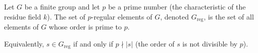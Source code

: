 Let $G$ be a finite group and let $p$ be a prime number (the characteristic of the residue field $k$). The set of $p$-regular elements of $G$, denoted $G_{\text{reg}}$, is the set of all elements of $G$ whose order is prime to $p$.

Equivalently, $s \in G_{\text{reg}}$ if and only if $p \nmid |s|$ (the order of $s$ is not divisible by $p$).

